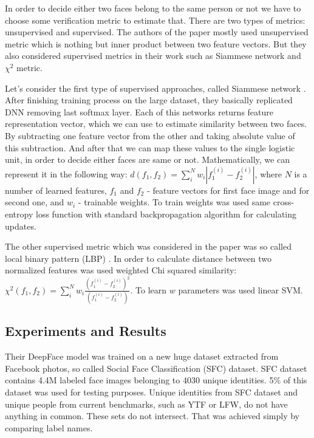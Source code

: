 \documentclass[paper=a4, fontsize=11pt]{scrartcl} %
\numberwithin{equation}{section} %
\numberwithin{figure}{section} %
\numberwithin{table}{section} %
\begin{document}
In order to decide either two faces belong to the same person or not we have to choose some verification metric to estimate that. There are two types of metrics: unsupervised and supervised. The authors of the paper mostly used unsupervised metric which is nothing but inner product between two feature vectors. But they also considered supervised metrics in their work such as Siammese network and $\chi^2$ metric. \par

Let's consider the first type of supervised approaches, called Siammese network \cite{chopra2005learning}. After finishing training process on the large dataset, they basically replicated DNN removing last softmax layer. Each of this networks returns feature representation vector, which we can use to estimate similarity between two faces. By subtracting one feature vector from the other and taking absolute value of this subtraction. And after that we can map these values to the single logistic unit, in order to decide either faces are same or not. Mathematically, we can represent it in the following way: $d(f_1, f_2) = \sum_i^N w_i|f_1^{(i)} - f_2^{(i)}|$, where $N$ is a number of learned features, $f_1$ and $f_2$ - feature vectors for first face image and for second one, and $w_i$ - trainable weights. To train weights was used same cross-entropy loss function with standard backpropagation algorithm for calculating updates. \par

The other supervised metric which was considered in the paper was so called local binary pattern (LBP) \cite{ahonen2006face}. In order to calculate distance between two normalized features was used weighted Chi squared similarity: $\chi^2(f_1, f_2) = \sum_i^N w_i\frac{(f_1^{(i)} - f_2^{(i)})^2}{(f_1^{(i)} - f_2^{(i)})}$. To learn $w$ parameters was used linear SVM.
\subsection{Experiments and Results}
Their DeepFace model was trained on a new huge dataset extracted from Facebook photos, so called Social Face Classification (SFC) dataset. SFC dataset contains 4.4M labeled face images belonging to 4030 unique identities. 5$\%$ of this dataset was used for testing purposes. Unique identities from SFC dataset and unique people from current benchmarks, such as YTF or LFW, do not have anything in common. These sets do not intersect. That was achieved simply by comparing label names.\par
\end{document}
